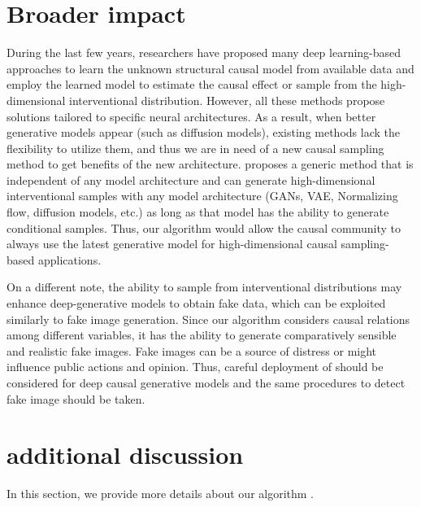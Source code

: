 \documentclass{article}
\newcommand{\idgen}{\text{ID-GEN}\xspace}
\theoremstyle{plain}
\theoremstyle{definition}
\theoremstyle{remark}
\begin{document}
\section{Broader impact}
\label{appex-broader-impact}
During the last few years, researchers have proposed many deep learning-based approaches to learn the unknown structural causal model from available
data and employ the learned model to estimate the causal effect or sample from the high-dimensional interventional distribution. However, all these methods propose solutions tailored to specific neural architectures. As a result, when better generative models appear (such as diffusion models), existing methods lack the flexibility to utilize them, and thus we are in need of a new causal sampling method to get benefits of the new architecture.
\idgen proposes a generic method that is independent of any model architecture and can generate high-dimensional interventional samples with any model architecture (GANs, VAE, Normalizing flow, diffusion models, etc.) as long as that model has the ability to generate conditional samples. Thus, our algorithm would allow the causal community to always use the latest generative model for high-dimensional causal sampling-based applications.

On a different note,  the ability to sample from interventional distributions may enhance deep-generative models to obtain fake data, which can be exploited similarly to fake image generation.
Since our algorithm considers causal relations among different variables, it has the ability to generate comparatively sensible and realistic fake images.
Fake images can be a source of distress or might influence public actions and opinion.
Thus, careful deployment of should be considered for deep causal generative models and
the same procedures to detect fake image should be taken.




\section{\idgen additional discussion}

In this section, we provide more details about our algorithm \idgen.
\end{document}
